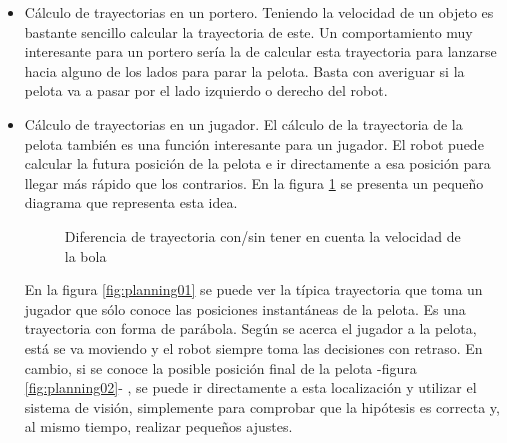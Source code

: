 \begin{itemize}

\item Cálculo de trayectorias en un portero. Teniendo la velocidad de un objeto es bastante sencillo calcular la trayectoria de este. Un comportamiento muy interesante para un portero sería la de calcular esta trayectoria para lanzarse hacia alguno de los lados para parar la pelota. Basta con averiguar si la pelota va a pasar por el lado izquierdo o derecho del robot. 

\item Cálculo de trayectorias en un jugador. El cálculo de la trayectoria de la pelota también es una función interesante para un jugador. El robot puede calcular la futura posición de la pelota e ir directamente a esa posición para llegar más rápido que los contrarios. En la figura \ref{fig:planning} se presenta un pequeño diagrama que representa esta idea.

\begin{figure}[h]
  \centering
  \caption{Diferencia de trayectoria con/sin tener en cuenta la velocidad de la bola}
  \label{fig:planning}
\end{figure}

En la figura \ref{fig:planning01} se puede ver la típica trayectoria que toma un jugador que sólo conoce las posiciones instantáneas de la pelota. Es una trayectoria con forma de parábola. Según se acerca el jugador a la pelota, está se va moviendo y el robot siempre toma las decisiones con retraso. En cambio, si se conoce la posible posición final de la pelota -figura \ref{fig:planning02}- , se puede ir directamente a esta localización y utilizar el sistema de visión, simplemente para comprobar que la hipótesis es correcta y, al mismo tiempo, realizar pequeños ajustes.


\end{itemize}
